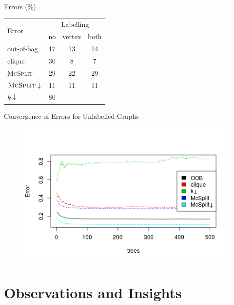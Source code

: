 \documentclass{beamer}
\begin{document}
\begin{frame}{Errors (\%)}
  \centering
  \begin{tabular}{l c c c}
    \toprule
    \multirow{2}{*}{Error} & \multicolumn{3}{c}{Labelling} \\
    \cmidrule(lr){2-4}
                           & no & vertex & both \\
    \midrule
    out-of-bag & 17 & 13 & 14 \\
    clique & 30 & 8 & 7 \\
    \textsc{McSplit} & 29 & 22 & 29 \\
    $\textsc{McSplit}\downarrow$ & 11 & 11 & 11 \\
    $k\downarrow$ & 80 & & \\
    \bottomrule
  \end{tabular}
\end{frame}

\begin{frame}{Convergence of Errors for Unlabelled Graphs}
  \begin{figure}
    \centering
    \includegraphics[scale=0.5]{../dissertation/images/unlabelled_forest_errors.png}
  \end{figure}
\end{frame}

\section{Observations and Insights}
\end{document}
